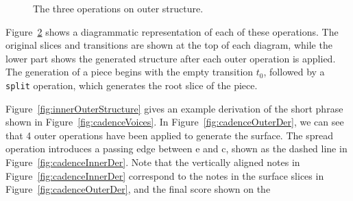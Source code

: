\documentclass[12pt,a4paper,twoside,openright]{report} \usepackage[pdfborder={0 0 0}]{hyperref}    %
\theoremstyle{definition} \newtheorem{definition}{Definition}[section]
\begin{document}
\begin{figure}[h]
\begin{subfigure}[t]{.24\textwidth}
\label{fig:freezeOp} \end{subfigure} \centering \captionsetup{width=.9\linewidth} \caption{The three operations on outer
structure. } \label{fig:outerOperations} \end{figure}

Figure~\ref{fig:outerOperations} shows a diagrammatic representation of each of these operations. The original slices
and transitions are shown at the top of each diagram, while the lower part shows the generated structure after each
outer operation is applied. The generation of a piece begins with the empty transition $t_0$, followed by
a \texttt{split} operation, which generates the root slice of the piece. 

Figure~\ref{fig:innerOuterStructure} gives an example derivation of the short phrase shown in
Figure~\ref{fig:cadenceVoices}. In Figure~\ref{fig:cadenceOuterDer}, we can see that 4 outer operations have been
applied to generate the surface. The spread operation introduces a passing edge between e and c, shown as the dashed
line in Figure~\ref{fig:cadenceInnerDer}. Note that the vertically aligned notes in Figure~\ref{fig:cadenceInnerDer}
correspond to the notes in the surface slices in Figure~\ref{fig:cadenceOuterDer}, and the final score shown on the
\end{document}
